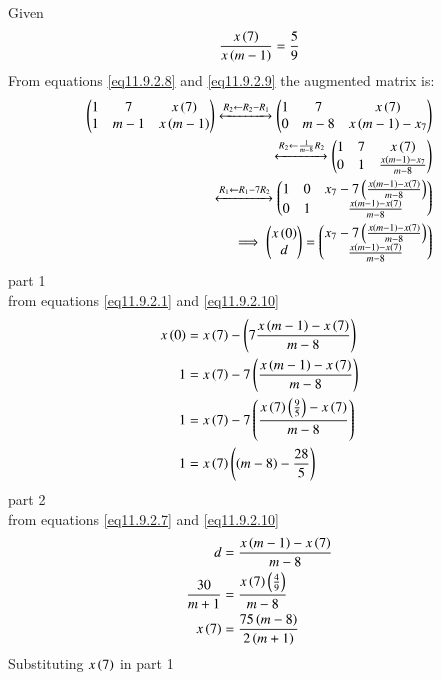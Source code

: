\documentclass[journal,12pt,twocolumn]{IEEEtran}
\theoremstyle{remark}
\begin{document}
Given 
\begin{align}
\frac{x\left(7\right)}{x\left(m-1\right)} = \frac{5}{9} \label{eq11.9.2.10}
\end{align}
From  equations \eqref{eq11.9.2.8} and \eqref{eq11.9.2.9} the augmented matrix is:\\
\begin{align}
 \begin{pmatrix}
   1 & 7 & x\left(7\right)
   \\
   1 & m-1 & x\left(m-1\right)
 \end{pmatrix}
 \xleftrightarrow[]{R_2 \leftarrow {R_2-R_1}}
 \begin{pmatrix}
   1 & 7 & x\left(7\right)
   \\
   0 & m-8 & x\left(m-1\right)-x_7
 \end{pmatrix}
 \\
 \xleftrightarrow[]{R_2 \leftarrow {\frac{1}{m-8}R_2}}
 \begin{pmatrix}
   1 & 7 & x\left(7\right)
   \\
   0 & 1 & \frac{x\left(m-1\right)-x_7}{m-8}
 \end{pmatrix}
 \\
 \xleftrightarrow[]{R_1 \leftarrow {R_1-7{R_2}}}
 \begin{pmatrix}
   1 & 0 & x_7-7\left(\frac{x\left(m-1\right)-x\left(7\right)}{m-8}\right)
   \\
   0 & 1 & \frac{x\left(m-1\right)-x\left(7\right)}{m-8}
 \end{pmatrix}
 \\
 \implies \begin{pmatrix}
   x\left(0\right)
   \\
   d
 \end{pmatrix}
 =
 \begin{pmatrix}
   x_7-7\left(\frac{x\left(m-1\right)-x\left(7\right)}{m-8}\right)
   \\
   \frac{x\left(m-1\right)-x\left(7\right)}{m-8}
 \end{pmatrix}
\end{align}
part 1\\
from equations \eqref{eq11.9.2.1} and \eqref{eq11.9.2.10}\\
\begin{align}
    x\left(0\right)&=x\left(7\right)-\left(7\frac{x\left(m-1\right)-x\left(7\right)}{m-8}\right)\\
    1&=x\left(7\right)-7\left(\frac{x\left(m-1\right)-x\left(7\right)}{m-8}\right)\\
    1&=x\left(7\right)-7\left(\frac{x\left(7\right)\left(\frac{9}{5}\right)-x\left(7\right)}{m-8}\right)\\
    1&=x\left(7\right)\left(\left(m-8\right)-\frac{28}{5}\right)
\end{align}
part 2\\
from equations \eqref{eq11.9.2.7} and \eqref{eq11.9.2.10}\\
 \begin{align}
    d&=\frac{x\left(m-1\right)-x\left(7\right)}{m-8}\\
    \frac{30}{m+1}&=\frac{x\left(7\right)\left(\frac{4}{9}\right)}{m-8}\\
    x\left(7\right)&=\frac{75\left(m-8\right)}{2\left(m+1\right)}\\
 \end{align}
Substituting $x\left(7\right)$ in part 1\\
\end{document}
